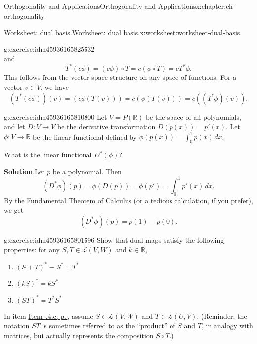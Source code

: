\documentclass[oneside,10pt,]{book}
\newcommand{\blocktitlefont}{\relax}
\newcommand{\xreffont}{\relax}
\numberwithin{equation}{section}
\newcommand{\R}{\mathbb{R}}
\begin{document}
\begin{chapterptx}{Orthogonality and Applications}{}{Orthogonality and Applications}{}{}{x:chapter:ch-orthogonality}
\begin{worksheet-section}{Worksheet: dual basis.}{}{Worksheet: dual basis.}{}{}{x:worksheet:worksheet-dual-basis}
\begin{divisionexercise}{2}{}{}{g:exercise:idm45936165825632}
\begin{equation*}
\end{equation*}
and%
\begin{equation*}
T^*(c\phi) = (c\phi)\circ T = c(\phi\circ T) = cT^*\phi\text{.}
\end{equation*}
This follows from the vector space structure on any space of functions. For a vector \(v\in V\), we have%
\begin{equation*}
(T^*(c\phi))(v) = (c\phi(T(v)))=c(\phi(T(v)))=c((T^*\phi)(v))\text{.}
\end{equation*}
%
\end{divisionexercise}%
\begin{divisionexercise}{3}{}{}{g:exercise:idm45936165810800}%
Let \(V=P(\R)\) be the space of all polynomials, and let \(D:V\to V\) be the derivative transformation \(D(p(x))=p'(x)\). Let \(\phi:V\to \R\) be the linear functional defined by \(\phi(p(x)) = \int_0^1 p(x)\,dx\).%
\par
What is the linear functional \(D^*(\phi)\)?%
\par\smallskip%
\noindent\textbf{\blocktitlefont Solution}.\label{g:solution:idm45936165803696}{}\hypertarget{g:solution:idm45936165803696}{}\quad{}Let \(p\) be a polynomial. Then%
\begin{equation*}
(D^*\phi)(p) = \phi(D(p))=\phi(p') = \int_0^1 p'(x)\,dx\text{.}
\end{equation*}
By the Fundamental Theorem of Calculus (or a tedious calculation, if you prefer), we get%
\begin{equation*}
(D^*\phi)(p) = p(1)-p(0)\text{.}
\end{equation*}
%
\end{divisionexercise}%
\begin{divisionexercise}{4}{}{}{g:exercise:idm45936165801696}%
Show that dual maps satisfy the following properties: for any \(S,T\in \mathcal{L}(V,W)\) and \(k\in \R\),%
\begin{enumerate}[label=(\alph*)]
\item{}\(\displaystyle (S+T)^* = S^*+T^*\)%
\item{}\(\displaystyle (kS)^* = kS^*\)%
\item\label{x:li:list-property-last}{}\hypertarget{x:li:list-property-last}{}\(\displaystyle (ST)^* = T^*S^*\)%
\end{enumerate}
%
\par
In item \hyperlink{x:li:list-property-last}{Item~{\xreffont 3.3.4.c}, p.\,\pageref{x:li:list-property-last}}, assume \(S\in \mathcal{L}(V,W)\) and \(T\in \mathcal{L}(U,V)\). (Reminder: the notation \(ST\) is sometimes referred to as the ``product'' of \(S\) and \(T\), in analogy with matrices, but actually represents the composition \(S\circ T\).)%

\end{divisionexercise}
\end{worksheet-section}
\end{chapterptx}
\end{document}
